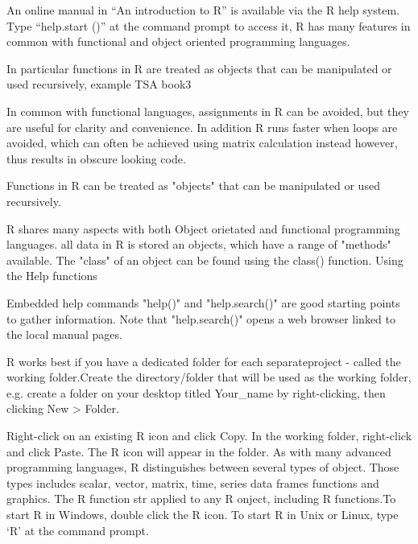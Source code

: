 An online manual in “An introduction to R” is available via the R help system. Type “help.start ()” at the command prompt to access it, R   has many features in common with functional and object oriented programming languages.



In particular functions in R are treated as objects that can be manipulated or used recursively, example TSA book3

In common with functional languages, assignments in R can be avoided, but they are useful for clarity and convenience. In addition R runs faster when loops are avoided, which can often be achieved using matrix calculation instead however, thus results in obscure looking code.


Functions in R can be treated as "objects" that can be manipulated or used recursively.

R shares many aspects with both Object orietated and functional programming languages. all data in R is stored an objects, which have a range of "methods" available. The "class" of an object can be found using the class() function.
Using the Help functions

Embedded help commands "help()" and "help.search()" are good starting points to gather information.
Note that "help.search()" opens a web browser linked to the local manual pages.
 

R works best if you have a dedicated folder for each separateproject - called the working folder.Create the directory/folder that will be used as the working folder, e.g. create a folder on your desktop titled Your_name by right-clicking, then clicking New > Folder. 
 
Right-click on an existing R icon and click Copy.   In the working folder, right-click and click Paste. The R icon will appear in the folder. As with many advanced programming languages, R distinguishes between several types of object. Those types includes scalar, vector, matrix, time, series data frames functions and graphics. The R function str applied to any R onject, including R functions.To start R in Windows, double click the R icon. To start R in Unix or Linux, type ‘R’ at the command prompt. 



